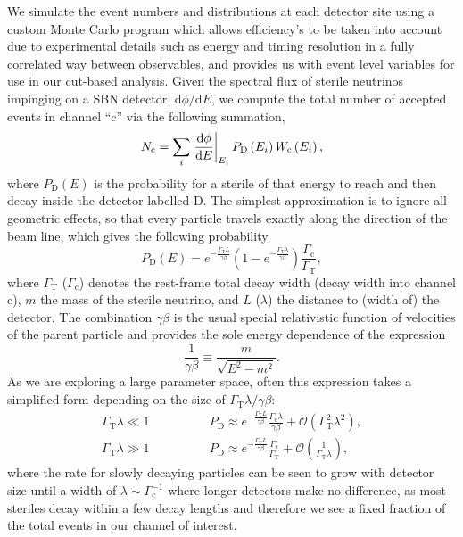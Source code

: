 \documentclass[11pt, a4paper]{article}
\def\ster{\ensuremath N}
\begin{document}
We simulate the event numbers and distributions at each detector site using a custom
Monte Carlo program which allows efficiency's to be taken into account due to
experimental details such as energy and timing resolution in a fully correlated
way between observables, and provides us with event level variables for use in
our cut-based analysis. 
%
Given the spectral flux of sterile neutrinos impinging on a SBN detector,
$\mathrm{d}\phi/\mathrm{d}E$, we compute the total number of accepted events in
channel ``$\text{c}$'' via the following summation,
%
\[ \ster_\text{c} = \sum_{i} \left .
\frac{\mathrm{d}\phi}{\mathrm{d}E}\right|_{E_i} P_\text{D}\left(E_i\right)
W_\text{c}\left(E_i\right),  \]
%
where $P_\text{D}(E)$ is the probability for a sterile of that energy to reach
and then decay inside the detector labelled $\text{D}$. The simplest
approximation is to ignore all geometric effects, so that every particle
travels exactly along the direction of the beam line, which gives the following
probability 
%
\[ P_\text{D}\left(E\right) = e^{-\frac{\Gamma_\text{T}L}{\gamma\beta}}\left(
1-
e^{-\frac{\Gamma_\text{T}\lambda}{\gamma\beta}}\right)\frac{\Gamma_\text{c}}{\Gamma_\text{T}},
\label{eq:prob} \]
%
where $\Gamma_\text{T}$ ($\Gamma_\text{c}$) denotes the rest-frame total decay
width (decay width into channel $\text{c}$), $m$ the mass of the sterile
neutrino, and $L$ ($\lambda$) the distance to (width of) the detector. The
combination $\gamma\beta$ is the usual special relativistic function of
velocities of the parent particle and provides the sole energy dependence of
the expression
%
\[   \frac{1}{\gamma\beta} \equiv \frac{m}{\sqrt{E^2-m^2}}. \]
%
As we are exploring a large parameter space, often this expression takes a
simplified form depending on the size of $\Gamma_\text{T}\lambda/\gamma\beta$:
%
\begin{align} 
%
\Gamma_\text{T}\lambda \ll 1\qquad&\qquad P_\text{D} \approx
e^{-\frac{\Gamma_\text{T}L}{\gamma\beta}}\frac{\Gamma_\text{c}\lambda}{\gamma\beta}
+ \mathcal{O}\left(\Gamma_\text{T}^2\lambda^2\right),\label{eq:prob_dec1}\\
%
\Gamma_\text{T}\lambda \gg 1\qquad&\qquad P_\text{D} \approx
e^{-\frac{\Gamma_\text{T}L}{\gamma\beta}}\frac{\Gamma_\text{c}}{\Gamma_\text{T}}
+ \mathcal{O}\left(\frac{1}{\Gamma_\text{T}\lambda}\right),
\label{eq:prob_dec2}
%
\end{align}
%
where the rate for slowly decaying particles can be seen to grow with detector
size until a width of $\lambda\sim\Gamma_\text{c}^{-1}$ where longer detectors
make no difference, as most steriles decay within a few decay lengths and
therefore we see a fixed fraction of the total events in our channel of
interest. 
\end{document}
